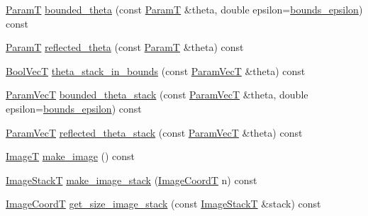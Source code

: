 \begin{DoxyCompactItemize}
\hyperlink{classmappel_1_1PointEmitterModel_a665ec6aea3aac139bb69a23c06d4b9a1}{ParamT} \hyperlink{classmappel_1_1PointEmitterModel_ac342b21db8970dfa0b2809ffe5e73d06}{bounded\+\_\+theta} (const \hyperlink{classmappel_1_1PointEmitterModel_a665ec6aea3aac139bb69a23c06d4b9a1}{ParamT} \&theta, double epsilon=\hyperlink{classmappel_1_1PointEmitterModel_ac987a119137b85a27704b1c40e3fab8c}{bounds\+\_\+epsilon}) const 
\item 
\hyperlink{classmappel_1_1PointEmitterModel_a665ec6aea3aac139bb69a23c06d4b9a1}{ParamT} \hyperlink{classmappel_1_1PointEmitterModel_a7dd386776870462e8f20c646b6fed1e3}{reflected\+\_\+theta} (const \hyperlink{classmappel_1_1PointEmitterModel_a665ec6aea3aac139bb69a23c06d4b9a1}{ParamT} \&theta) const 
\item 
\hyperlink{namespacemappel_a167d761ecce3cafb6f98c00c16bdb523}{Bool\+VecT} \hyperlink{classmappel_1_1PointEmitterModel_a7b6a59b4bc796b440025cffb7a6159f8}{theta\+\_\+stack\+\_\+in\+\_\+bounds} (const \hyperlink{classmappel_1_1PointEmitterModel_add253b568d763f1513a810aac35de719}{Param\+VecT} \&theta) const 
\item 
\hyperlink{classmappel_1_1PointEmitterModel_add253b568d763f1513a810aac35de719}{Param\+VecT} \hyperlink{classmappel_1_1PointEmitterModel_a6671c06d391ae9a09dd5de78dcc636fe}{bounded\+\_\+theta\+\_\+stack} (const \hyperlink{classmappel_1_1PointEmitterModel_add253b568d763f1513a810aac35de719}{Param\+VecT} \&theta, double epsilon=\hyperlink{classmappel_1_1PointEmitterModel_ac987a119137b85a27704b1c40e3fab8c}{bounds\+\_\+epsilon}) const 
\item 
\hyperlink{classmappel_1_1PointEmitterModel_add253b568d763f1513a810aac35de719}{Param\+VecT} \hyperlink{classmappel_1_1PointEmitterModel_ae24c17017ff5e37e1dd9ea9a1aeefa7f}{reflected\+\_\+theta\+\_\+stack} (const \hyperlink{classmappel_1_1PointEmitterModel_add253b568d763f1513a810aac35de719}{Param\+VecT} \&theta) const 
\item 
\hyperlink{classmappel_1_1ImageFormat1DBase_a521a1ff391a52a636fac4aac7c7ba02c}{ImageT} \hyperlink{classmappel_1_1ImageFormat1DBase_afa59b2dd9ba997262fa17ef7d1122996}{make\+\_\+image} () const 
\item 
\hyperlink{classmappel_1_1ImageFormat1DBase_a81e3246d1c5c37ebf9077b7b5bd25a76}{Image\+StackT} \hyperlink{classmappel_1_1ImageFormat1DBase_ab2c4470c335a6abb2d3b9c442339ca0c}{make\+\_\+image\+\_\+stack} (\hyperlink{classmappel_1_1ImageFormat1DBase_a82ab3168eb1a87eaeb3e7c919188e9fc}{Image\+CoordT} n) const 
\item 
\hyperlink{classmappel_1_1ImageFormat1DBase_a82ab3168eb1a87eaeb3e7c919188e9fc}{Image\+CoordT} \hyperlink{classmappel_1_1ImageFormat1DBase_afa0e79b58955f5ecfd39c8f8d06f22ad}{get\+\_\+size\+\_\+image\+\_\+stack} (const \hyperlink{classmappel_1_1ImageFormat1DBase_a81e3246d1c5c37ebf9077b7b5bd25a76}{Image\+StackT} \&stack) const 

\end{DoxyCompactItemize}
